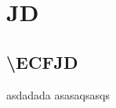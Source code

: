 \documentclass[a4paper, titlepage, 12pt]{article}
\begin{document}
\section*{JD}
\subsection*{\textbackslash ECFJD}
\normalfont\ECFJD
asdadada
\newpage
\normalfont\ECFJD
asasaqsasqs
\end{document}
